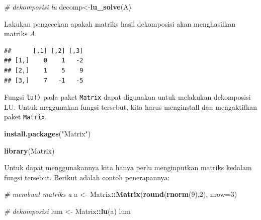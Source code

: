 \documentclass[]{book}
\newenvironment{Shaded}{\begin{snugshade}}{\end{snugshade}}
\newcommand{\CommentTok}[1]{\textcolor[rgb]{0.56,0.35,0.01}{\textit{#1}}}
\newcommand{\DataTypeTok}[1]{\textcolor[rgb]{0.13,0.29,0.53}{#1}}
\newcommand{\DecValTok}[1]{\textcolor[rgb]{0.00,0.00,0.81}{#1}}
\newcommand{\KeywordTok}[1]{\textcolor[rgb]{0.13,0.29,0.53}{\textbf{#1}}}
\newcommand{\NormalTok}[1]{#1}
\newcommand{\OperatorTok}[1]{\textcolor[rgb]{0.81,0.36,0.00}{\textbf{#1}}}
\newcommand{\StringTok}[1]{\textcolor[rgb]{0.31,0.60,0.02}{#1}}
\theoremstyle{definition}
\theoremstyle{definition}
\theoremstyle{definition}
\theoremstyle{remark}
\begin{document}
\begin{Shaded}
\begin{Highlighting}[]
\CommentTok{# dekomposisi lu}
\NormalTok{decomp<-}\KeywordTok{lu_solve}\NormalTok{(A)}
\end{Highlighting}
\end{Shaded}

Lakukan pengecekan apakah matriks hasil dekomposisi akan menghasilkan matriks \(A\).

\begin{Shaded}
\end{Shaded}

\begin{verbatim}
##      [,1] [,2] [,3]
## [1,]    0    1   -2
## [2,]    1    5    9
## [3,]    7   -1   -5
\end{verbatim}

Fungsi \texttt{lu()} pada paket \texttt{Matrix} dapat digunakan untuk melakukan dekomposisi LU. Untuk meggunakan fungsi tersebut, kita harus menginstall dan mengaktifkan paket \texttt{Matrix}.

\begin{Shaded}
\begin{Highlighting}[]
\KeywordTok{install.packages}\NormalTok{(}\StringTok{"Matrix"}\NormalTok{)}
\end{Highlighting}
\end{Shaded}

\begin{Shaded}
\begin{Highlighting}[]
\KeywordTok{library}\NormalTok{(Matrix)}
\end{Highlighting}
\end{Shaded}

Untuk dapat menggunakannya kita hanya perlu menginputkan matriks kedalam fungsi tersebut. Berikut adalah contoh penerapannya:

\begin{Shaded}
\begin{Highlighting}[]
\CommentTok{# membuat matriks a }
\NormalTok{a <-}\StringTok{ }\NormalTok{Matrix}\OperatorTok{::}\KeywordTok{Matrix}\NormalTok{(}\KeywordTok{round}\NormalTok{(}\KeywordTok{rnorm}\NormalTok{(}\DecValTok{9}\NormalTok{),}\DecValTok{2}\NormalTok{), }\DataTypeTok{nrow=}\DecValTok{3}\NormalTok{)}

\CommentTok{# dekomposisi}
\NormalTok{lum <-}\StringTok{ }\NormalTok{Matrix}\OperatorTok{::}\KeywordTok{lu}\NormalTok{(a)}
\NormalTok{lum}
\end{Highlighting}
\end{Shaded}
\end{document}
